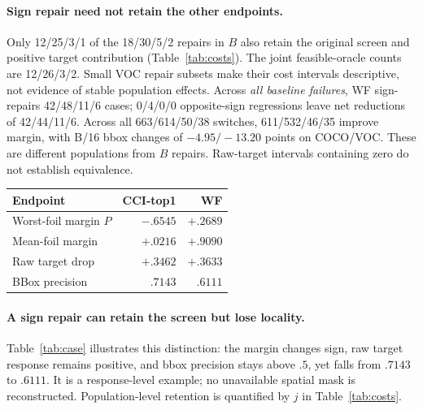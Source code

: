 \documentclass[10pt]{article}
\begin{document}
\paragraph{Sign repair need not retain the other endpoints.}
Only 12/25/3/1 of the 18/30/5/2 repairs in $B$ also retain the original
screen and positive target contribution (Table~\ref{tab:costs}). The joint
feasible-oracle counts are 12/26/3/2. Small VOC repair subsets make their
cost intervals descriptive, not evidence of stable population effects.
Across \emph{all baseline failures}, WF sign-repairs 42/48/11/6 cases;
0/4/0/0 opposite-sign regressions leave net reductions of 42/44/11/6.
Across all 663/614/50/38 switches, 611/532/46/35 improve margin, with
B/16 bbox changes of $-4.95/-13.20$ points on COCO/VOC.
These are different populations from $B$ repairs. Raw-target intervals
containing zero do not establish equivalence.


\newpage
\par\addvspace{6pt}
\noindent\begin{minipage}{\columnwidth}
\centering
{}
\label{tab:case}
\small\renewcommand{\arraystretch}{1.12}
\begin{tabular*}{\columnwidth}{@{\extracolsep{\fill}}lrr@{}}
\toprule
Endpoint & CCI-top1 & WF\\
\midrule
Worst-foil margin $P$ & $-.6545$ & $+.2689$\\
Mean-foil margin & $+.0216$ & $+.9090$\\
Raw target drop & $+.3462$ & $+.3633$\\
BBox precision & $.7143$ & $.6111$\\
\bottomrule
\end{tabular*}
\end{minipage}\par\vspace{8pt}

\paragraph{A sign repair can retain the screen but lose locality.}
Table~\ref{tab:case} illustrates this distinction: the margin changes sign,
raw target response remains positive, and bbox precision stays above $.5$,
yet falls from $.7143$ to $.6111$. It is a response-level example;
no unavailable spatial mask is reconstructed. Population-level retention
is quantified by $j$ in Table~\ref{tab:costs}.
\end{document}
